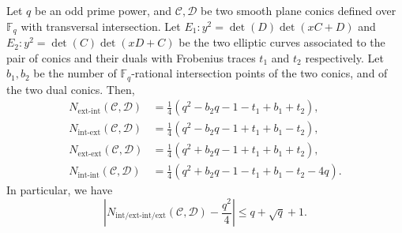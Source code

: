 \documentclass[10pt,a4paper]{amsart}
\begin{document}
\begin{thm}\label{thm: main_conic_case}
Let $q$ be an odd prime power, and $\mathcal C, \mathcal D$ be two smooth plane conics defined over $\mathbb{F}_q$ with transversal intersection. Let \(E_1: y^2 = \det(D)\det(xC + D)\) and \(E_2: y^2 = \det(C)\det(xD + C)\) be the two elliptic curves associated to the pair of conics and their duals with Frobenius traces $t_1$ and $t_2$ respectively. Let $b_1,b_2$ be the number of $\mathbb{F}_q$-rational intersection points of the two conics, and of the two dual conics. Then,
\begin{align*}
    N_{\mathrm{ext\text{-}int}}(\mathcal C,\mathcal D) &= \frac{1}{4}\left(q^2-b_2q-1-t_1+b_1+t_2\right) ,\\ 
    N_{\mathrm{int\text{-}ext}}(\mathcal C,\mathcal D) &= \frac{1}{4}\left(q^2-b_2q-1+t_1+b_1-t_2\right) ,\\
    N_{\mathrm{ext\text{-}ext}}(\mathcal C,\mathcal D) &= \frac{1}{4}\left(q^2+b_2q-1+t_1+b_1+t_2\right) ,\\
    N_{\mathrm{int\text{-}int}}(\mathcal C,\mathcal D) &= \frac{1}{4}\left(q^2+b_2q-1-t_1+b_1-t_2-4q\right).
\end{align*}
In particular, we have 
$$\left|N_{\mathrm{int/ext\text{-}int/ext}}(\mathcal{C}, \mathcal{D}) - \frac{q^2}{4}\right|\leq q+\sqrt{q}+1.$$
\end{thm}
\end{document}
